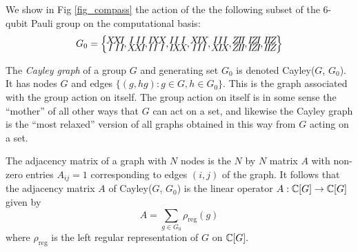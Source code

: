 \documentclass[12pt]{article}
\begin{document}
We show in Fig \ref{fig_compass} the action
of the 
the following subset of the 6-qubit Pauli group %
on the computational basis:
$$
\arraycolsep=-1pt\def\arraystretch{0.2}
G_0 = \Bigl\{
\begin{array}{ccc}
X&X&I\\
I&I&I
\end{array},
\begin{array}{ccc}
I&I&I\\
X&X&I
\end{array},
\begin{array}{ccc}
I&X&X\\
I&I&I
\end{array},
\begin{array}{ccc}
I&I&I\\
I&X&X
\end{array},
\begin{array}{ccc}
X&I&X\\
I&I&I
\end{array},
\begin{array}{ccc}
I&I&I\\
X&I&X
\end{array},
\begin{array}{ccc}
Z&I&I\\
Z&I&I
\end{array},
\begin{array}{ccc}
I&Z&I\\
I&Z&I
\end{array},
\begin{array}{ccc}
I&I&Z\\
I&I&Z
\end{array}
\Bigr\}
$$

The {\it Cayley graph} of a group $G$ and
generating set $G_0$ is denoted Cayley($G$, $G_0$).
It has nodes $G$ and edges $\{(g, hg) : g \in G, h \in G_0\}$.
This is the graph associated with the group action on itself.
The group action on itself is in some sense the ``mother'' of all other ways that
$G$ can act on a set, and likewise the Cayley graph is the ``most relaxed'' version
of all graphs obtained in this way from $G$ acting on a set.

The adjacency matrix of a graph with $N$ nodes is the 
$N$ by $N$ matrix $A$ with non-zero entries $A_{ij}=1$ corresponding
to edges $(i, j)$ of the graph.
It follows that the adjacency matrix $A$ of Cayley($G$, $G_0$)
is the linear operator $A:\mathbb{C}[G]\to\mathbb{C}[G]$
given by
$$
    A = \sum_{g\in G_0}\rho_{\mathrm{reg}}(g)
$$
where $\rho_{\mathrm{reg}}$ is the left regular representation of
$G$ on $\mathbb{C}[G].$
\end{document}
